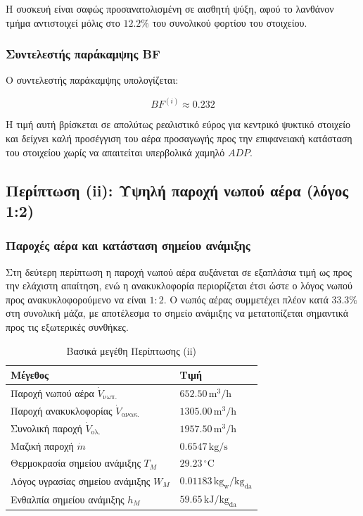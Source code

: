 \documentclass[12pt,a4paper]{article}
\begin{document}
Η συσκευή είναι σαφώς προσανατολισμένη σε αισθητή ψύξη, αφού το λανθάνον τμήμα
αντιστοιχεί μόλις στο \(12.2\%\) του συνολικού φορτίου του στοιχείου.

\subsubsection{Συντελεστής παράκαμψης BF}

Ο συντελεστής παράκαμψης υπολογίζεται:

\[
BF^{(i)} \approx 0.232
\]

Η τιμή αυτή βρίσκεται σε απολύτως ρεαλιστικό εύρος για κεντρικό ψυκτικό στοιχείο
και δείχνει καλή προσέγγιση του αέρα προσαγωγής προς την επιφανειακή κατάσταση του
στοιχείου χωρίς να απαιτείται υπερβολικά χαμηλό \(ADP\).

\subsection{Περίπτωση (ii): Υψηλή παροχή νωπού αέρα (λόγος 1:2)}

\subsubsection{Παροχές αέρα και κατάσταση σημείου ανάμιξης}

Στη δεύτερη περίπτωση η παροχή νωπού αέρα αυξάνεται σε εξαπλάσια τιμή ως προς την
ελάχιστη απαίτηση, ενώ η ανακυκλοφορία περιορίζεται έτσι ώστε ο λόγος νωπού προς
ανακυκλοφορούμενο να είναι \(1:2\). Ο νωπός αέρας συμμετέχει πλέον κατά
\(33.3\%\) στη συνολική μάζα, με αποτέλεσμα το σημείο ανάμιξης να μετατοπίζεται
σημαντικά προς τις εξωτερικές συνθήκες.

\begin{table}[H]
\centering
\caption{Βασικά μεγέθη Περίπτωσης (ii)}
\begin{tabularx}{\textwidth}{L C{4.3cm}}
\toprule
\textbf{Μέγεθος} & \textbf{Τιμή} \\
\midrule
Παροχή νωπού αέρα \(\dot V_{\text{νωπ.}}\) & \(652.50\,\mathrm{m^3/h}\) \\
Παροχή ανακυκλοφορίας \(\dot V_{\text{ανακ.}}\) & \(1305.00\,\mathrm{m^3/h}\) \\
Συνολική παροχή \(\dot V_{\text{ολ.}}\) & \(1957.50\,\mathrm{m^3/h}\) \\
Μαζική παροχή \(\dot m\) & \(0.6547\,\mathrm{kg/s}\) \\
\midrule
Θερμοκρασία σημείου ανάμιξης \(T_M\) & \(29.23\,^\circ\mathrm{C}\) \\
Λόγος υγρασίας σημείου ανάμιξης \(W_M\) & \(0.01183\,\mathrm{kg_w/kg_{da}}\) \\
Ενθαλπία σημείου ανάμιξης \(h_M\) & \(59.65\,\mathrm{kJ/kg_{da}}\) \\
\bottomrule
\end{tabularx}
\end{table}
\end{document}
